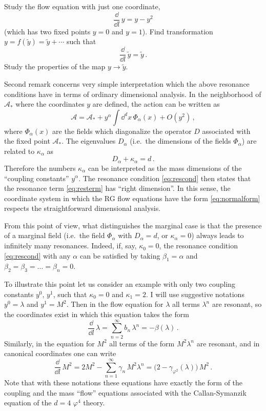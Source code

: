 \begin{exercise}
Study the flow equation with just one coordinate,
\[
\frac{\dd}{\dd l}\,y=y-y^2
\]
(which has two fixed points $y=0$ and $y=1$). Find transformation
$y=f(\tilde y)=\tilde y+\cdots$ such that
\[
\frac{\dd}{\dd l}\,\tilde y=\tilde y\,.
\]
Study the properties of the map $y\to\tilde y$.
\end{exercise}

Second remark concerns very simple interpretation which the above resonance
conditions have in terms of ordinary dimensional analysis. In the neighborhood of
$\mathcal A_*$ where the coordinates $y$ are defined, the action can be written as
\[
\mathcal A=\mathcal A_*+y^\alpha\int \dd^dx\,\Phi_\alpha(x)+O(y^2)\,,
\]
where $\Phi_\alpha(x)$ are the fields which diagonalize the operator $D$
associated with the fixed point $\mathcal A_*$. The eigenvalues $D_\alpha$ (i.e.\
the dimensions of the fields $\Phi_\alpha$) are related to $\kappa_\alpha$ as
\[
D_\alpha+\kappa_\alpha=d\,.
\]
Therefore the numbers $\kappa_\alpha$ can be interpreted as the mass dimensions of
the ``coupling constants'' $y^\alpha$. The resonance condition \eqref{eq:rescond}
then states that the resonance term \eqref{eq:resterm} has ``right dimension''. In
this sense, the coordinate system in which the RG flow equations have the form
\eqref{eq:normalform} respects the straightforward dimensional analysis.

From this point of view, what distinguishes the marginal case is that the presence
of a marginal field (i.e.\ the field $\Phi_\alpha$ with $D_\alpha=d$, or
$\kappa_\alpha=0$) always leads to infinitely many resonances. Indeed, if, say,
$\kappa_0=0$, the resonance condition \eqref{eq:rescond} with any $\alpha$ can be
satisfied by taking $\beta_1=\alpha$ and $\beta_2=\beta_3=\dots=\beta_n=0$.

To illustrate this point let us consider an example with only two coupling
constants $y^0$, $y^1$, such that $\kappa_0=0$ and $\kappa_1=2$. I will use
suggestive notations $y^0=\lambda$ and $y^1=M^2$. Then in the flow equation for
$\lambda$ all terms $\lambda^n$ are resonant, so the coordinates exist in which
this equation takes the form
\begin{equation}\label{eq:normallambda}
\frac{\dd}{\dd l}\,\lambda=\sum_{n=2}^\infty b_n\,\lambda^n=-\beta(\lambda)\,.
\end{equation}
Similarly, in the equation for $M^2$ all terms of the form $M^2\lambda^n$ are
resonant, and in canonical coordinates one can write
\begin{equation}\label{eq:normalM}
\frac{\dd}{\dd l}\,M^2=2M^2-\sum_{n=1}^\infty\gamma_n\,M^2\lambda^n=\bigl(2-\gamma_{\varphi^2}(\lambda)\bigr)\,M^2\,.
\end{equation}
Note that with these notations these equations have exactly the form of the
coupling and the mass ``flow'' equations associated with the Callan-Symanzik
equation of the $d=4$ $\varphi^4$ theory.

